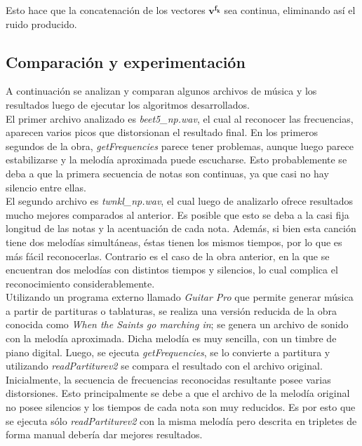 \documentclass[journal, monochrome]{IEEEtran}
\begin{document}
Esto hace que la concatenación de los vectores $\mathbf{v^{f_k}}$ sea continua, eliminando así el ruido producido.


\subsection{Comparación y experimentación}

A continuación se analizan y comparan algunos archivos de música y los resultados luego de ejecutar los algoritmos desarrollados.  \\

El primer archivo analizado es \emph{beet5\_np.wav}, el cual al reconocer las frecuencias, aparecen varios picos que distorsionan el resultado final. En los primeros segundos de la obra, \emph{getFrequencies} parece tener problemas, aunque luego parece estabilizarse y la melodía aproximada puede escucharse. Esto probablemente se deba a que la primera secuencia de notas son continuas, ya que casi no hay silencio entre ellas.  \\

El segundo archivo es \emph{twnkl\_np.wav}, el cual luego de analizarlo ofrece resultados mucho mejores comparados al anterior. Es posible que esto se deba a la casi fija longitud de las notas y la acentuación de cada nota. Además, si bien esta canción tiene dos melodías simultáneas, éstas tienen los mismos tiempos, por lo que es más fácil reconocerlas. Contrario es el caso de la obra anterior, en la que se encuentran dos melodías con distintos tiempos y silencios, lo cual complica el reconocimiento considerablemente. \\ 

Utilizando un programa externo llamado \emph{Guitar Pro} que permite generar música a partir de partituras o tablaturas, se realiza una versión reducida de la obra conocida como \emph{When the Saints go marching in}; se genera un archivo de sonido con la melodía aproximada. Dicha melodía es muy sencilla, con un timbre de piano digital. Luego, se ejecuta \emph{getFrequencies}, se lo convierte a partitura y utilizando \emph{readPartiturev2} se compara el resultado con el archivo original. Inicialmente, la secuencia de frecuencias reconocidas resultante posee varias distorsiones. Esto principalmente se debe a que el archivo de la melodía original no posee silencios y los tiempos de cada nota son muy reducidos. Es por esto que se ejecuta sólo \emph{readPartiturev2} con la misma melodía pero descrita en tripletes de forma manual debería dar mejores resultados.
\end{document}
